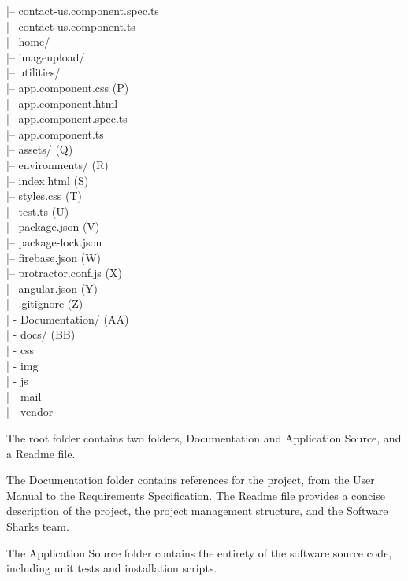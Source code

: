 \documentclass[a4paper, 11pt]{article}
\begin{document}
\begin{tabbing}
\>\>\>\>\>\>				|-- contact-us.component.spec.ts\\
\>\>\>\>\>\>				|-- contact-us.component.ts\\
\>\>\>\>\>			|-- home/\\
\>\>\>\>\>				|-- imageupload/\\
\>\>\>\>\>			|-- utilities/\\
\>\>\>\>\>				|-- app.component.css (P)\\
\>\>\>\>\>				|-- app.component.html\\
\>\>\>\>\>				|-- app.component.spec.ts\\
\>\>\>\>\>			|-- app.component.ts\\
\>\>\>		|-- assets/ (Q)\\
\>\>\>		|-- environments/ (R)\\
\>\>\>		|-- index.html (S)\\
\>\>\>		|-- styles.css (T)\\
\>\>\>		|-- test.ts (U)\\
\>\>	|-- package.json (V)\\
\>\>	|-- package-lock.json\\
\>\>	|-- firebase.json (W)\\
\>\>	|-- protractor.conf.js (X)\\
\>\>	|-- angular.json (Y)\\
\>|-- .gitignore (Z)\\
| - Documentation/ (AA)\\
| - docs/ (BB)\\
     \>| -  css\\
     \>| -  img\\
     \>| -  js\\
     \>| -  mail\\
     \>| -  vendor\\
\end{tabbing}


			


The root folder contains two folders, Documentation and Application Source, and a Readme file.

The Documentation folder contains references for the project, from the User Manual to the Requirements Specification.
The Readme file provides a concise description of the project, the project management structure, and the Software Sharks team.

The Application Source folder contains the entirety of the software source code, including unit tests and installation scripts.
\end{document}
